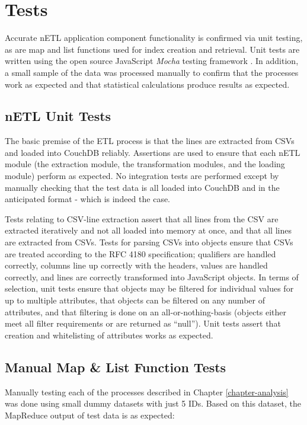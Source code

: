\section{Tests}
Accurate nETL application component functionality is confirmed via unit testing, as are map and list functions used for index creation and retrieval. Unit tests are written using the open source JavaScript \textit{Mocha} testing framework \cite{mochaTest}. In addition, a small sample of the data was processed manually to confirm that the processes work as expected and that statistical calculations produce results as expected.

\subsection{nETL Unit Tests}
The basic premise of the ETL process is that the lines are extracted from CSVs and loaded into CouchDB reliably. Assertions are used to ensure that each nETL module (the extraction module, the transformation modules, and the loading module) perform as expected. No integration tests are performed except by manually checking that the test data is all loaded into CouchDB and in the anticipated format - which is indeed the case.

Tests relating to CSV-line extraction assert that all lines from the CSV are extracted iteratively and not all loaded into memory at once, and that all lines are extracted from CSVs. Tests for parsing CSVs into objects ensure that CSVs are treated according to the RFC 4180 specification; qualifiers are handled correctly, columns line up correctly with the headers, values are handled correctly, and lines are correctly transformed into JavaScript objects. In terms of selection, unit tests ensure that objects may be filtered for individual values for up to multiple attributes, that objects can be filtered on any number of attributes, and that filtering is done on an all-or-nothing-basis (objects either meet all filter requirements or are returned as ``null''). Unit tests assert that creation and whitelisting of attributes works as expected.

\subsection{Manual Map \& List Function Tests}
Manually testing each of the processes described in Chapter \ref{chapter-analysis} was done using small dummy datasets with just 5 IDs. Based on this dataset, the MapReduce output of test data is as expected:

